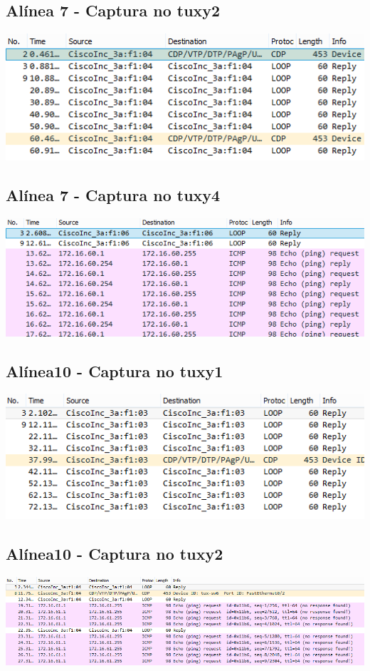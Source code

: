 \documentclass[11pt,a4paper,reqno]{report}
\numberwithin{equation}{section}
\begin{document}
\begin{appendices}
\subsection{Alínea 7 - Captura no tuxy2}
\label{ex2_tux1ping_tux2}
\includegraphics[width=18cm]{ex2_a7_tux2.png}
\subsection{Alínea 7 - Captura no tuxy4}
\label{ex2_tux1ping_tux4}
\includegraphics[width=18cm]{ex2_a7_tux4.png}

\subsection{Alínea10 - Captura no tuxy1}
\includegraphics[width=18cm]{ex2_a10_tux1.png}
\subsection{Alínea10 - Captura no tuxy2}
\includegraphics[width=18cm]{ex2_a10_tux2.png}

\end{appendices}
\end{document}
